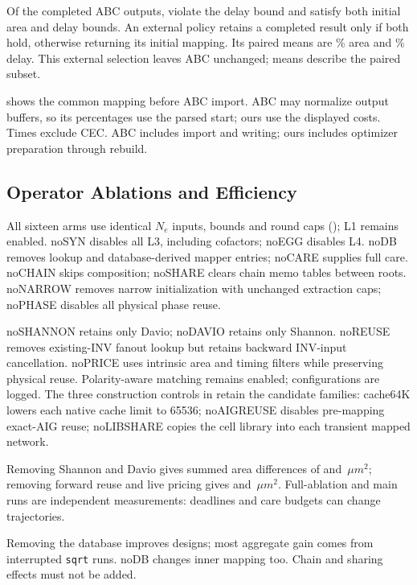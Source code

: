 Of the completed ABC outputs, \ABCViolations{} violate the delay bound and \ABCFeasible{} satisfy both initial area and delay bounds. An external policy retains a completed result only if both hold, otherwise returning its initial mapping. Its paired means are \mbox{\ABCGuardArea\%} area and \mbox{\ABCGuardDelay\%} delay. This external selection leaves ABC unchanged; means describe the paired subset.

 shows the common mapping before ABC import. ABC may normalize output buffers, so its percentages use the parsed start; ours use the displayed costs. Times exclude CEC. ABC includes import and writing; ours includes optimizer preparation through rebuild. 

\subsection{Operator Ablations and Efficiency}\label{sec:oracles}
\AblationResultTable


All sixteen arms use identical $N_e$ inputs, bounds and round caps (); L1 remains enabled. noSYN disables all L3, including cofactors; noEGG disables L4. noDB removes lookup and database-derived mapper entries; noCARE supplies full care. noCHAIN skips composition; noSHARE clears chain memo tables between roots. noNARROW removes narrow initialization with unchanged extraction caps; noPHASE disables all physical phase reuse.

noSHANNON retains only Davio; noDAVIO retains only Shannon. noREUSE removes existing-INV fanout lookup but retains backward INV-input cancellation. noPRICE uses intrinsic area and timing filters while preserving physical reuse. Polarity-aware matching remains enabled; configurations are logged. The three construction controls in  retain the candidate families: cache64K lowers each native cache limit to 65536; noAIGREUSE disables pre-mapping exact-AIG reuse; noLIBSHARE copies the cell library into each transient mapped network.

Removing Shannon and Davio gives summed area differences of \DeltaShannon{} and \DeltaDavio\,$\mu m^2$; removing forward reuse and live pricing gives \DeltaReuse{} and \DeltaPrice\,$\mu m^2$. \UsbAblationExample{} Full-ablation and main runs are independent measurements: deadlines and care budgets can change trajectories. \DeadlineExample{}

Removing the database improves \DBBetterCount{} designs; most aggregate gain comes from interrupted \texttt{sqrt} runs. noDB changes inner mapping too. Chain and sharing effects must not be added.

